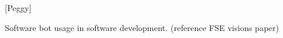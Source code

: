 \documentclass{sig-alternate}
\begin{document}
[Peggy]

Software bot usage in software development.
(reference FSE visions paper)




%



%


%

\listoftodos
%
%
\end{document}
